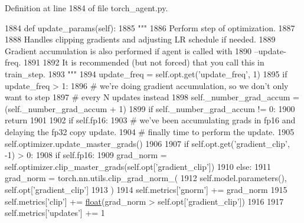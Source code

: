 Definition at line 1884 of file torch\+\_\+agent.\+py.


\begin{DoxyCode}
1884     \textcolor{keyword}{def }update\_params(self):
1885         \textcolor{stringliteral}{"""}
1886 \textcolor{stringliteral}{        Perform step of optimization.}
1887 \textcolor{stringliteral}{}
1888 \textcolor{stringliteral}{        Handles clipping gradients and adjusting LR schedule if needed.}
1889 \textcolor{stringliteral}{        Gradient accumulation is also performed if agent is called with}
1890 \textcolor{stringliteral}{        --update-freq.}
1891 \textcolor{stringliteral}{}
1892 \textcolor{stringliteral}{        It is recommended (but not forced) that you call this in train\_step.}
1893 \textcolor{stringliteral}{        """}
1894         update\_freq = self.opt.get(\textcolor{stringliteral}{'update\_freq'}, 1)
1895         \textcolor{keywordflow}{if} update\_freq > 1:
1896             \textcolor{comment}{# we're doing gradient accumulation, so we don't only want to step}
1897             \textcolor{comment}{# every N updates instead}
1898             self.\_number\_grad\_accum = (self.\_number\_grad\_accum + 1) %
1899             \textcolor{keywordflow}{if} self.\_number\_grad\_accum != 0:
1900                 \textcolor{keywordflow}{return}
1901 
1902         \textcolor{keywordflow}{if} self.fp16:
1903             \textcolor{comment}{# we've been accumulating grads in fp16 and delaying the fp32 copy update.}
1904             \textcolor{comment}{# finally time to perform the update.}
1905             self.optimizer.update\_master\_grads()
1906 
1907         \textcolor{keywordflow}{if} self.opt.get(\textcolor{stringliteral}{'gradient\_clip'}, -1) > 0:
1908             \textcolor{keywordflow}{if} self.fp16:
1909                 grad\_norm = self.optimizer.clip\_master\_grads(self.opt[\textcolor{stringliteral}{'gradient\_clip'}])
1910             \textcolor{keywordflow}{else}:
1911                 grad\_norm = torch.nn.utils.clip\_grad\_norm\_(
1912                     self.model.parameters(), self.opt[\textcolor{stringliteral}{'gradient\_clip'}]
1913                 )
1914             self.metrics[\textcolor{stringliteral}{'gnorm'}] += grad\_norm
1915             self.metrics[\textcolor{stringliteral}{'clip'}] += \hyperlink{namespaceprojects_1_1controllable__dialogue_1_1make__control__dataset_aa2b7207688c641dbc094ab44eca27113}{float}(grad\_norm > self.opt[\textcolor{stringliteral}{'gradient\_clip'}])
1916 
1917         self.metrics[\textcolor{stringliteral}{'updates'}] += 1

\end{DoxyCode}
